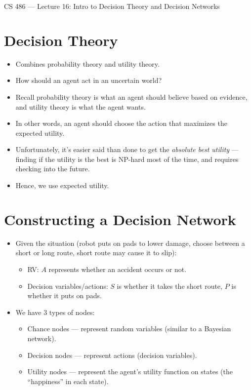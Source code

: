 \documentclass{article}
\author{Clement Tsang}
\begin{document}
\begin{center}
    \Large{CS 486 --- Lecture 16: Intro to Decision Theory and Decision Networks}
\end{center}

\section{Decision Theory}
\begin{itemize}
    \item Combines probability theory and utility theory.
    \item How should an agent act in an uncertain world?
    \item Recall probability theory is what an agent should believe based on evidence, and utility theory is what the agent wants.
    \item In other words, an agent should choose the action that maximizes the expected utility.
    \item Unfortunately, it's easier said than done to get the \emph{absolute best utility} --- finding if the utility is the best is NP-hard most of the time, and requires checking into the future.
    \item Hence, we use expected utility.
\end{itemize}

\section{Constructing a Decision Network}
\begin{itemize}
    \item Given the situation (robot puts on pads to lower damage, choose between a short or long route, short route may cause it to slip):
        \begin{itemize}
            \item RV: $A$ represents whether an accident occurs or not.
            \item Decision variables/actions: $S$ is whether it takes the short route, $P$ is whether it puts on pads.
        \end{itemize}
    \item We have 3 types of nodes:
        \begin{itemize}
            \item Chance nodes --- represent random variables (similar to a Bayesian network).
            \item Decision nodes --- represent actions (decision variables).
            \item Utility nodes --- represent the agent's utility function on states (the ``happiness'' in each state).
        \end{itemize}
\end{itemize}
\end{document}
